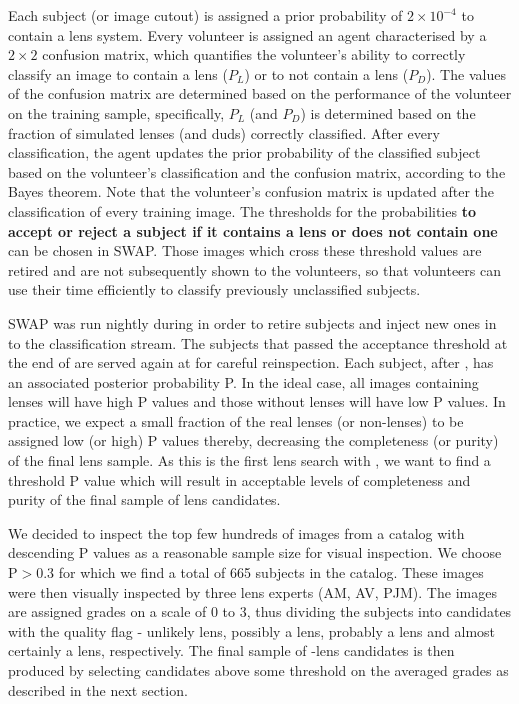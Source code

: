 \documentclass[useAMS,usenatbib,a4paper]{mn2e}
\begin{document}
Each subject (or image cutout) is assigned a prior probability of
$2\times10^{-4}$ to contain a lens system. Every volunteer
is assigned an agent characterised by a $2\times2$ confusion matrix,
which quantifies the volunteer's ability to correctly classify an image
to contain a lens ($P_L$) or to not contain a lens ($P_D$). The values of
the confusion matrix are determined based on the performance of the
volunteer on the training sample, specifically, $P_L$ (and $P_D$) is
determined based on the fraction of simulated lenses (and duds)
correctly classified. After every classification, the agent updates the
prior probability of the classified subject based on the volunteer's classification
and the confusion matrix, according to the Bayes theorem.
Note that the volunteer's confusion matrix is updated after the
classification of every training image. The thresholds for the
probabilities {\bf to accept or reject a subject if it contains a lens or does
not contain one} can be chosen in SWAP. Those images which cross
these threshold values are retired and are not subsequently shown to the
volunteers, so that volunteers can use their time efficiently to
classify previously unclassified subjects.

SWAP was run nightly during \StageOne in order to retire subjects and inject new
ones in to the classification stream. The subjects that passed the acceptance
threshold at the end of \StageOne are served again at \StageTwo for careful
reinspection. Each subject, after \StageTwo, has an associated posterior
probability P. In the ideal case, all images containing lenses will have high P
values and those without lenses will have low P values. In practice, we expect a
small fraction of the real lenses (or non-lenses) to be assigned low (or high) P
values thereby, decreasing the completeness (or purity) of the final lens
sample. As this is the first lens search with \sw, we want to find a
threshold P value which will result in acceptable levels of completeness and
purity of the final sample of lens candidates.

We decided to inspect the top few hundreds of images from a catalog with
descending P values as a reasonable sample size for visual inspection.
We choose P$>0.3$ for which we find a total of 665 subjects in the
catalog. These images were then visually inspected by three lens experts
(AM, AV, PJM).  The images are assigned grades on a scale of 0 to 3,
thus dividing the subjects into candidates with the quality flag -
unlikely lens, possibly a lens, probably a lens and almost certainly a
lens, respectively. The final sample of \sw-\cfhtls lens candidates is
then produced by selecting candidates above some threshold on the
averaged grades as described in the next section.
\end{document}

